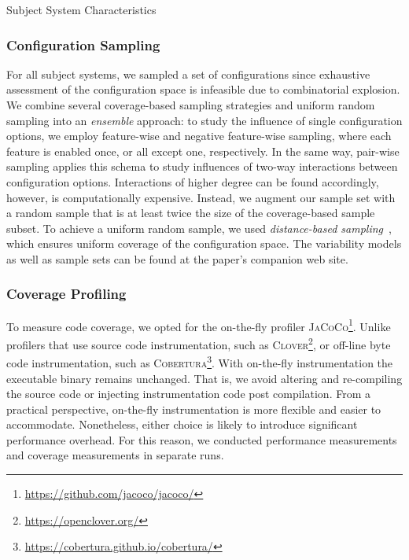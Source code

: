 {	\begin{table}[ht!]
		\centering
		\caption{Subject System Characteristics}
		
		\label{tab:subject_systems}
	\end{table}

	\subsubsection{Configuration Sampling}
	For all subject systems, we sampled a set of configurations since exhaustive assessment of the configuration space is infeasible due to combinatorial explosion. We combine several coverage-based sampling strategies and uniform random sampling into an \emph{ensemble} approach: to study the influence of single configuration options, we employ feature-wise and negative feature-wise sampling, where each feature is enabled once, or all except one, respectively. In the same way, pair-wise sampling applies this schema to study influences of two-way interactions between configuration options. Interactions of higher degree can be found accordingly, however, is computationally expensive. Instead, we augment our sample set with a random sample that is at least twice the size of the coverage-based sample subset. To achieve a uniform random sample, we used \emph{distance-based sampling}~\cite{kaltenecker_distance-based_2019}, which ensures uniform coverage of the configuration space. The variability models as well as sample sets can be found at the paper's companion web site.
	
	\subsubsection{Coverage Profiling}\label{sec:profiling}
	To measure code coverage, we opted for the on-the-fly profiler \textsc{JaCoCo}\footnote{\url{https://github.com/jacoco/jacoco/}}. Unlike profilers that use source code instrumentation, such as \textsc{Clover}\footnote{\url{https://openclover.org/}}, or off-line byte code instrumentation, such as \textsc{Cobertura}\footnote{\url{https://cobertura.github.io/cobertura/}}. With on-the-fly instrumentation the executable binary remains unchanged. That is, we avoid altering and re-compiling the source code or injecting instrumentation code post compilation. From a practical perspective, on-the-fly instrumentation is more flexible and easier to accommodate. Nonetheless, either choice is likely to introduce significant performance overhead. For this reason, we conducted performance measurements and coverage measurements in separate runs.
	
}
